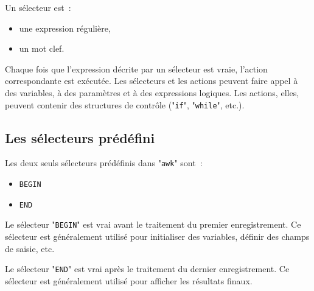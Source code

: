 Un s{\'e}lecteur est~:
\begin{itemize}
	\item	une expression r{\'e}guli{\`e}re,
	\item	un mot clef.
\end{itemize}

Chaque fois que l'expression d{\'e}crite par un s{\'e}lecteur est vraie,
l'action cor\-res\-pon\-dante est ex{\'e}cut{\'e}e. Les s{\'e}lecteurs et les actions
peuvent faire appel {\`a} des variables, {\`a} des param{\`e}tres et {\`a} des
expressions logiques. Les actions, elles, peuvent contenir des
structures de contr{\^o}le ("\texttt{if}", "\texttt{while}", etc.).

\subsection{Les s{\'e}lecteurs pr{\'e}d{\'e}fini}

Les deux seuls s{\'e}lecteurs pr{\'e}d{\'e}finis dans "\texttt{awk}" sont~:
\begin{itemize}
	\item	{}\texttt{BEGIN}
	\item	{}\texttt{END}
\end{itemize}

Le s{\'e}lecteur "\texttt{BEGIN}" est vrai avant le traitement du premier
enregistrement. Ce s{\'e}lecteur est g{\'e}n{\'e}ralement utilis{\'e} pour initialiser
des variables, d{\'e}finir des champs de saisie, etc.

Le s{\'e}lecteur "\texttt{END}" est vrai apr{\`e}s le traitement du dernier
enregistrement. Ce s{\'e}lecteur est g{\'e}n{\'e}ralement utilis{\'e} pour afficher les
r{\'e}sultats finaux.

